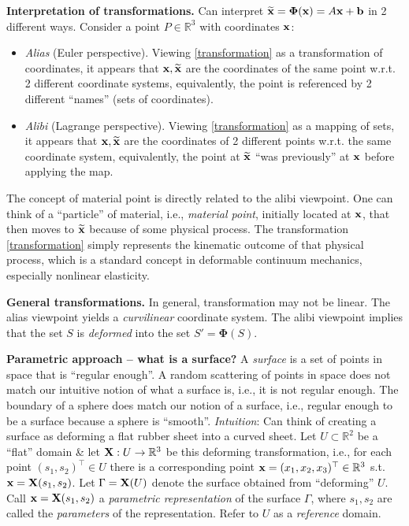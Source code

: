 \documentclass{article}
\begin{document}
\begin{enumerate}
	{\bf Interpretation of transformations.} Can interpret $\widetilde{\bf x} = \boldsymbol{\Phi}({\bf x}) = A{\bf x} + {\bf b}$ in 2 different ways. Consider a point $P\in\mathbb{R}^3$ with coordinates ${\bf x}$:
	\begin{itemize}
		\item {\it Alias} (Euler perspective). Viewing \eqref{transformation} as a transformation of coordinates, it appears that ${\bf x},\widetilde{\bf x}$ are the coordinates of the same point w.r.t. 2 different coordinate systems, equivalently, the point is referenced by 2 different ``names'' (sets of coordinates).
		\item {\it Alibi} (Lagrange perspective). Viewing \eqref{transformation} as a mapping of sets, it appears that ${\bf x},\widetilde{\bf x}$ are the coordinates of 2 different points w.r.t. the same coordinate system, equivalently, the point at $\widetilde{\bf x}$ ``was previously'' at ${\bf x}$ before applying the map.
	\end{itemize}
	The concept of material point is directly related to the alibi viewpoint. One can think of a ``particle'' of material, i.e., {\it material point}, initially located at ${\bf x}$, that then moves to $\widetilde{\bf x}$ because of some physical process. The transformation \eqref{transformation} simply represents the kinematic outcome of that physical process, which is a standard concept in deformable continuum mechanics, especially nonlinear elasticity.
	
	{\bf General transformations.} In general, transformation may not be linear. The alias viewpoint yields a {\it curvilinear} coordinate system. The alibi viewpoint implies that the set $S$ is {\it deformed} into the set $S' = \boldsymbol{\Phi}(S)$. 
	
	{\bf Parametric approach -- what is a surface?} A {\it surface} is a set of points in space that is ``regular enough''. A random scattering of points in space does not match our intuitive notion of what a surface is, i.e., it is not regular enough. The boundary of a sphere does match our notion of a surface, i.e., regular enough to be a surface because a sphere is ``smooth''. {\it Intuition}: Can think of creating a surface as deforming a flat rubber sheet into a curved sheet. Let $U\subset\mathbb{R}^2$ be a ``flat'' domain \& let ${\bf X}:U\to\mathbb{R}^3$ be this deforming transformation, i.e., for each point $(s_1,s_2)^\top\in U$ there is a corresponding point ${\bf x} = (x_1,x_2,x_3)^\top\in\mathbb{R}^3$ s.t. ${\bf x} = {\bf X}(s_1,s_2)$. Let $\Gamma = {\bf X}(U)$ denote the surface obtained from ``deforming'' $U$. Call ${\bf x} = {\bf X}(s_1,s_2)$ a {\it parametric representation} of the surface $\Gamma$, where $s_1,s_2$ are called the {\it parameters} of the representation. Refer to $U$ as a {\it reference} domain.
	

\end{enumerate}
\end{document}

